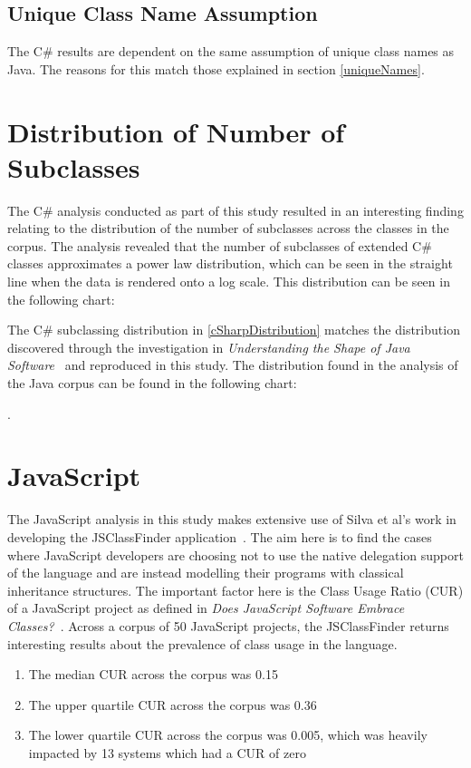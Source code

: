 \subsection{Unique Class Name Assumption}
The C\# results are dependent on the same assumption of unique class names as Java. The reasons for this match those explained in section \ref{uniqueNames}.

\section{Distribution of Number of Subclasses}
The C\# analysis conducted as part of this study resulted in an interesting finding relating to the distribution of the number of subclasses across the classes in the corpus. The analysis revealed that the number of subclasses of extended C\# classes approximates a power law distribution, which can be seen in the straight line when the data is rendered onto a log scale. This distribution can be seen in the following chart:



The C\# subclassing distribution in \ref{cSharpDistribution} matches the distribution discovered through the investigation in \textit{Understanding the Shape of Java Software}~\cite{ShapeOfJava} and reproduced in this study. The distribution found in the analysis of the Java corpus can be found in the following chart: 

.

\section{JavaScript}
The JavaScript analysis in this study makes extensive use of Silva et al's work in developing the JSClassFinder application~\cite{JSClassFinder}. The aim here is to find the cases where JavaScript developers are choosing not to use the native delegation support of the language and are instead modelling their programs with classical inheritance structures. The important factor here is the Class Usage Ratio (CUR) of a JavaScript project as defined in \textit{Does JavaScript Software Embrace Classes?~\cite{JSClassFinder}}. Across a corpus of 50 JavaScript projects, the JSClassFinder returns interesting results about the prevalence of class usage in the language.
\begin{enumerate}
	\item The median CUR across the corpus was 0.15
	\item The upper quartile CUR across the corpus was 0.36
	\item The lower quartile CUR across the corpus was 0.005, which was heavily impacted by 13 systems which had a CUR of zero
\end{enumerate}

